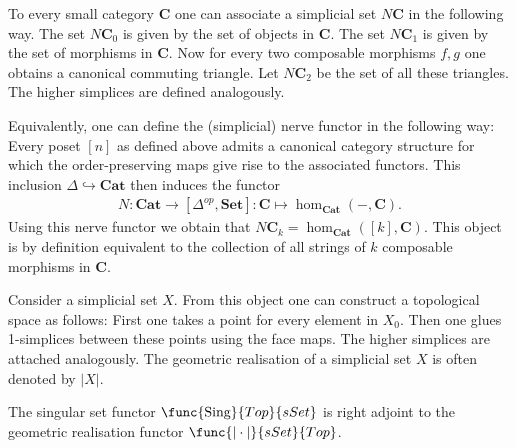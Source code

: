     \begin{construct}[Nerve]
        To every small category \textbf{C} one can associate a simplicial set $N\mathbf{C}$ in the following way. The set $N\mathbf{C}_0$ is given by the set of objects in $\mathbf{C}$. The set $N\mathbf{C}_1$ is given by the set of morphisms in $\mathbf{C}$. Now for every two composable morphisms $f, g$ one obtains a canonical commuting triangle. Let $N\mathbf{C}_2$ be the set of all these triangles. The higher simplices are defined analogously.

        Equivalently, one can define the (simplicial) nerve functor in the following way: Every poset $[n]$ as defined above admits a canonical category structure for which the order-preserving maps give rise to the associated functors. This inclusion $\Delta\hookrightarrow\mathbf{Cat}$ then induces the functor
        \begin{gather}
            N:\textbf{Cat}\rightarrow[\Delta^{op}, \textbf{Set}]:\mathbf{C}\mapsto\hom_{\mathbf{Cat}}(-, \mathbf{C}).
        \end{gather}
        Using this nerve functor we obtain that $N\mathbf{C}_k=\hom_{\mathbf{Cat}}([k], \mathbf{C})$. This object is by definition equivalent to the collection of all strings of $k$ composable morphisms in $\mathbf{C}$.
    \end{construct}

    \begin{construct}
        Consider a simplicial set $X$. From this object one can construct a topological space as follows: First one takes a point for every element in $X_0$. Then one glues 1-simplices between these points using the face maps. The higher simplices are attached analogously. The geometric realisation of a simplicial set $X$ is often denoted by $|X|$.
    \end{construct}

    \begin{property}
        The singular set functor $\func{\text{Sing}}{Top}{sSet}$ is right adjoint to the geometric realisation functor $\func{|\cdot|}{sSet}{Top}$.
    \end{property}

